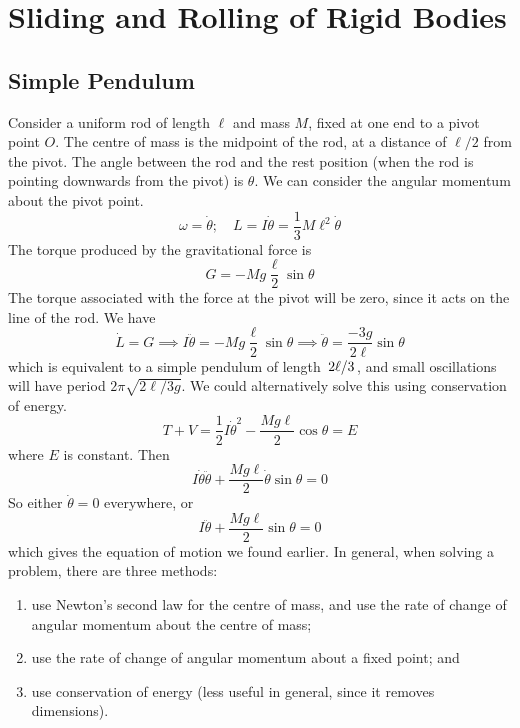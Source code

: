 \documentclass{article}
\begin{document}
\section{Sliding and Rolling of Rigid Bodies}
\subsection{Simple Pendulum}
Consider a uniform rod of length $\ell$ and mass $M$, fixed at one end to a pivot point $O$. The centre of mass is the midpoint of the rod, at a distance of $\ell/2$ from the pivot. The angle between the rod and the rest position (when the rod is pointing downwards from the pivot) is $\theta$. We can consider the angular momentum about the pivot point.
\[ \omega = \dot\theta;\quad L = I \dot\theta = \frac{1}{3}M\ell^2 \dot\theta \]
The torque produced by the gravitational force is
\[ G = -Mg \frac{\ell}{2}\sin\theta \]
The torque associated with the force at the pivot will be zero, since it acts on the line of the rod. We have
\[ \dot L = G \implies I\ddot\theta = -Mg\frac{\ell}{2}\sin\theta \implies \ddot\theta = \frac{-3g}{2\ell}\sin\theta \]
which is equivalent to a simple pendulum of length $\flatfrac{2\ell}{3}$, and small oscillations will have period $2\pi\sqrt{2\ell/3g}$. We could alternatively solve this using conservation of energy.
\[ T + V = \frac{1}{2}I\dot\theta^2 - \frac{Mg\ell}{2}\cos\theta = E \]
where $E$ is constant. Then
\[ I\dot\theta\ddot\theta + \frac{Mg\ell}{2}\dot\theta\sin\theta = 0 \]
So either $\dot\theta = 0$ everywhere, or
\[ I\ddot\theta + \frac{Mg\ell}{2}\sin\theta = 0 \]
which gives the equation of motion we found earlier. In general, when solving a problem, there are three methods:
\begin{enumerate}
	\item use Newton's second law for the centre of mass, and use the rate of change of angular momentum about the centre of mass;
	\item use the rate of change of angular momentum about a fixed point; and
	\item use conservation of energy (less useful in general, since it removes dimensions).
\end{enumerate}
\end{document}
